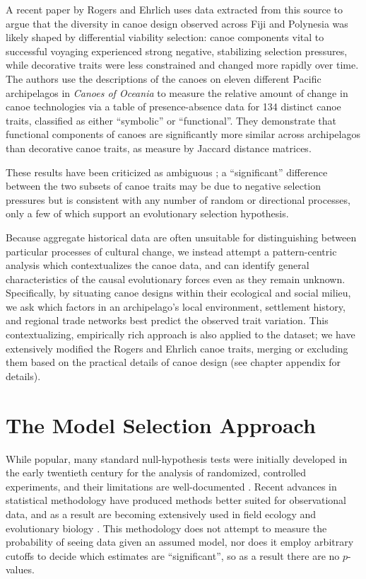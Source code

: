 A recent paper by Rogers and Ehrlich \citep{Rogers2008:Canoes} uses data extracted from this source to argue that the diversity in canoe design observed across Fiji and Polynesia was likely shaped by differential viability selection: canoe components vital to successful voyaging experienced strong negative, stabilizing selection pressures, while decorative traits were less constrained and changed more rapidly over time. The authors use the descriptions of the canoes on eleven different Pacific archipelagos in \textit{Canoes of Oceania} to measure the relative amount of change in canoe technologies via a table of presence-absence data for 134 distinct canoe traits, classified as either ``symbolic'' or ``functional''.  They demonstrate that functional components of canoes are significantly more similar across archipelagos than decorative canoe traits, as measure by Jaccard distance matrices.

These results have been criticized as ambiguous \citep{Skoyles2008:canoechange}; a ``significant'' difference between the two subsets of canoe traits may be due to negative selection pressures but is consistent with any number of random or directional processes, only a few of which support an evolutionary selection hypothesis.  

Because aggregate historical data are often unsuitable for distinguishing between particular processes of cultural change, we instead attempt a pattern-centric analysis which contextualizes the canoe data, and can identify general characteristics of the causal evolutionary forces even as they remain unknown.  Specifically, by situating canoe designs within their ecological and social milieu, we ask which factors in an archipelago's local environment, settlement history, and regional trade networks best predict the observed trait variation.  This contextualizing, empirically rich approach is also applied to the dataset; we have extensively modified the Rogers and Ehrlich \citeyearpar{Rogers2008:Canoes} canoe traits, merging or excluding them based on the practical details of canoe design (see chapter appendix for details). 
 

\section{The Model Selection Approach}
 
While popular, many standard null-hypothesis tests were initially developed in the early twentieth century for the analysis of randomized, controlled experiments, and their limitations are well-documented \citep{Berger1988, Cohen1994, Anderson2000:nhst}.  Recent advances in statistical methodology have produced methods better suited for observational data, and as a result are becoming extensively used in field ecology and evolutionary biology \citep{Hilborn1997, Johnson&Omland2004:modelselection, Bolker2008}.  This methodology does not attempt to measure the probability of seeing data given an assumed model, nor does it employ arbitrary cutoffs to decide which estimates are ``significant'', so as a result there are no $p$-values.

